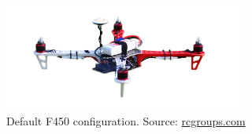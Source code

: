 \begin{figure}[htbp]
	\centering
	\includegraphics[width=0.7\textwidth]{./figures/f450/f450-stock.png}
	\caption{Default F450 configuration. {\footnotesize Source: \url{rcgroups.com}}}
	\label{fig:f450stock}
\end{figure}

